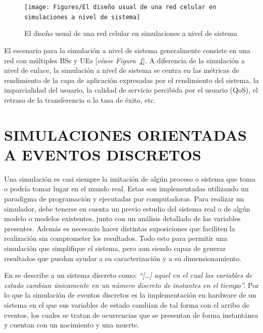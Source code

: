 \begin{figure}[th]
\centering
\texttt{[image: Figures/El diseño usual de una red celular en simulaciones a nivel de sistema]}
\decoRule
\caption[El diseño usual de una red celular en simulaciones a nivel de sistema]{El diseño usual de una red celular en simulaciones a nivel de sistema}
\label{fig:sim_sistema}
\end{figure}

El escenario para la simulación a nivel de sistema generalmente consiste en una red con múltiples BSs y UEs [\textit{véase Figura~\ref{fig:sim_sistema}}]. A diferencia de la simulación a nivel de enlace, la simulación a nivel de sistema se centra en las métricas de rendimiento de la capa de aplicación expresadas por el rendimiento del sistema, la imparcialidad del usuario, la calidad de servicio percibida por el usuario (QoS), el retraso de la transferencia o la tasa de éxito, etc.


\section{SIMULACIONES ORIENTADAS A EVENTOS DISCRETOS}


Una simulación es casi siempre la imitación de algún proceso o sistema que toma o podría tomar lugar en el mundo real. Estas son implementadas utilizando un paradigma de programación y ejecutadas por computadoras. Para realizar un simulador, debe tenerse en cuenta un previo estudio del sistema real o de algún modelo o modelos existentes, junto con un análisis detallado de las variables presentes. Además es necesario hacer distintas suposiciones que faciliten la realización sin comprometer los resultados. Todo esto para permitir una simulación que simplifique el sistema, pero aun siendo capaz de generar resultados que puedan ayudar a su caracterización y a su dimensionamiento. \newline

En \parencite{Banks2005} se describe a un sistema discreto como: \textit{``[{\dots}] aquel en el cual las variables de estado cambian únicamente en un número discreto de instantes en el tiempo''.} Por lo que la simulación de eventos discretos es la implementación en hardware de un sistema en el que sus variables de estado cambian de tal forma con el arribo de eventos, los cuales se tratan de ocurrencias que se presentan de forma instantánea y cuentan con un nacimiento y una muerte.\newline


